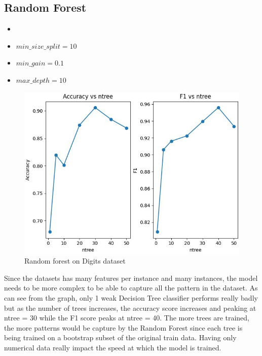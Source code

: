 \documentclass[letterpaper]{article}
\begin{document}
\subsection*{Random Forest}
\begin{itemize}
	\item {}
	\item $min\_size\_split = 10$
	\item $min\_gain = 0.1$
	\item $max\_depth = 10$
\end{itemize}

\begin{figure}[H]
	\includegraphics[width=\textwidth]{figures/forest_digits_ig.jpg}
	\caption{Random forest on Digits dataset}
	\label{fig:forest-digits}
\end{figure}

Since the datasets has many features per instance and many instances, the model needs to be more complex to be able to capture all the pattern
in the dataset. As can see from the graph, only 1 weak Decision Tree classifier performs really badly but as the number of trees increases, the accuracy
score increases and peaking at ntree = 30 while the F1 score peaks at ntree = 40. The more trees are trained, the more patterns would be capture by
the Random Forest since each tree is being trained on a bootstrap subset of the original train data. Having only numerical data really impact the
speed at which the model is trained.
\end{document}
